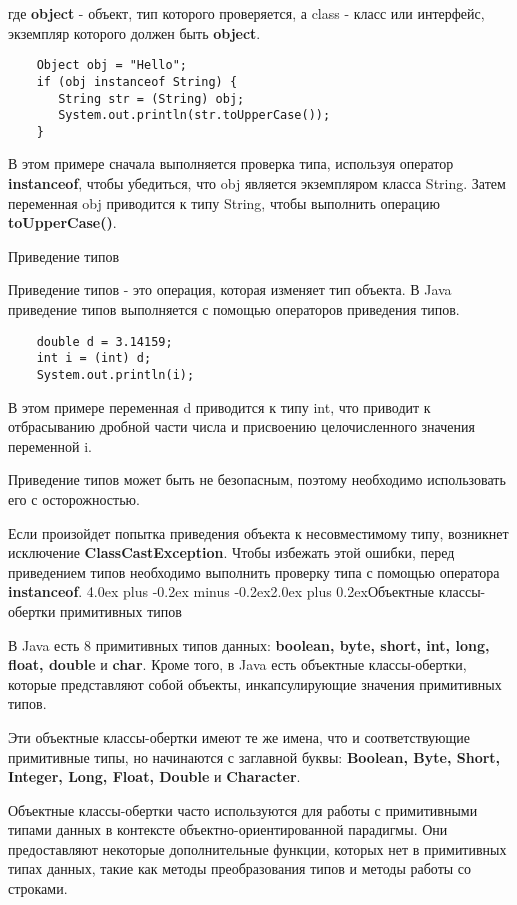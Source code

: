 \documentclass[12pt, a4paper]{book}%
\makeatletter
\renewcommand{\section}{\@startsection{section}{1}{1pt}%
{4.0ex plus -0.2ex minus -0.2ex}{2.0ex plus 0.2ex}{\centering\bf}}%
\makeatother
\begin{document}
{где {\bf object} - объект, тип которого проверяется, а class - класс или интерфейс, экземпляр которого должен быть {\bf object}.

\begin{lstlisting}
    Object obj = "Hello";
    if (obj instanceof String) {
       String str = (String) obj;
       System.out.println(str.toUpperCase());
    }
\end{lstlisting}

В этом примере сначала выполняется проверка типа, используя оператор {\bf instanceof}, чтобы убедиться, что obj является экземпляром класса String. Затем переменная obj приводится к типу String, чтобы выполнить операцию {\bf toUpperCase()}.

Приведение типов

Приведение типов - это операция, которая изменяет тип объекта. В Java приведение типов выполняется с помощью операторов приведения типов.

\begin{lstlisting}
    double d = 3.14159;
    int i = (int) d;
    System.out.println(i);
\end{lstlisting}

В этом примере переменная d приводится к типу int, что приводит к отбрасыванию дробной части числа и присвоению целочисленного значения переменной i.

Приведение типов может быть не безопасным, поэтому необходимо использовать его с осторожностью. 

Если произойдет попытка приведения объекта к несовместимому типу, возникнет исключение {\bf ClassCastException}. Чтобы избежать этой ошибки, перед приведением типов необходимо выполнить проверку типа с помощью оператора {\bf instanceof}.
\section{Объектные классы-обертки примитивных типов}

В Java есть 8 примитивных типов данных: {\bf boolean, byte, short, int, long, float, double} и {\bf char}. Кроме того, в Java есть объектные классы-обертки, которые представляют собой объекты, инкапсулирующие значения примитивных типов.

Эти объектные классы-обертки имеют те же имена, что и соответствующие примитивные типы, но начинаются с заглавной буквы: {\bf Boolean, Byte, Short, Integer, Long, Float, Double} и {\bf Character}.

Объектные классы-обертки часто используются для работы с примитивными типами данных в контексте объектно-ориентированной парадигмы. Они предоставляют некоторые дополнительные функции, которых нет в примитивных типах данных, такие как методы преобразования типов и методы работы со строками.

}
\end{document}
